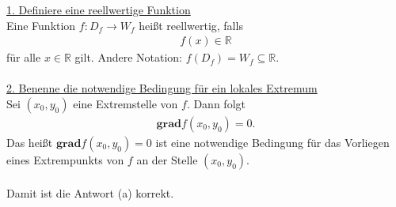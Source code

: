 \underline{1. Definiere eine reellwertige Funktion}\\
Eine Funktion $ f :  D_f \to W_f $ heißt reellwertig, falls
\begin{align*}
f(x) \in \mathbb{R}
\end{align*}
für alle $ x \in \mathbb{R}$ gilt. 
Andere Notation: $ f(D_f) = W_f  \subseteq \mathbb{R}$.\\
\\
\underline{2. Benenne die notwendige Bedingung für ein lokales Extremum}\\
Sei $ (x_0,y_0) $ eine Extremstelle von $ f $.
Dann folgt 
\begin{align*}
\textbf{grad} f(x_0,y_0) = 0.
\end{align*}
Das heißt $ \textbf{grad} f(x_0,y_0) = 0 $ ist eine notwendige Bedingung für das Vorliegen eines Extrempunkts von $ f $ an der Stelle $ (x_0,y_0) $.\\
\\
Damit ist die Antwort (a) korrekt.

\newpage
